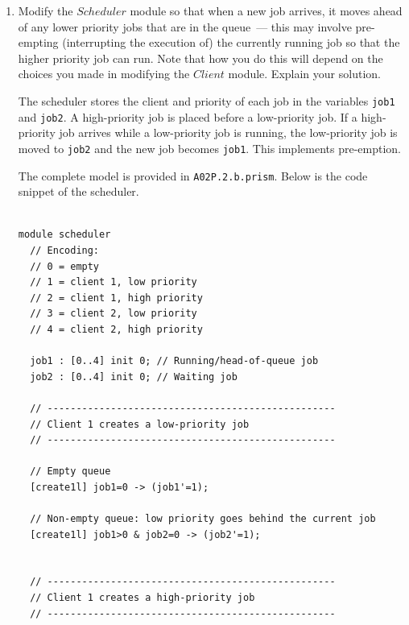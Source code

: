 \documentclass[12pt,a4paper]{article}
\newcommand{\prismident}[1]{\mathit{#1}}
\newcommand{\Pname}[1]{\prismident{#1}}
\begin{document}
\begin{description}
\begin{enumerate}[label=\alph*)]
\begin{lstlisting}
endmodule

module client2 = client1 [state1=state2,
                          task1=task2,
                          create1l=create2l,
                          create1h=create2h,
                          serve1=serve2,
                          finish1=finish2 ]
endmodule

\end{lstlisting}

\color{black}
\fi
%
\item Modify the $\Pname{Scheduler}$ module so that when a new job arrives, it moves ahead of any lower priority jobs that are in the queue~---
this may involve pre-empting (interrupting the execution of) the currently running job so that the higher priority job can run. Note that how
you do this will depend on the choices you made in modifying the $\Pname{Client}$ module. Explain your solution. 
%
\ifwithanswers
\color{blue}
\par
The scheduler stores the client and priority of each job in the variables
\texttt{job1} and \texttt{job2}. A high-priority job is placed before a
low-priority job. If a high-priority job arrives while a low-priority job
is running, the low-priority job is moved to \texttt{job2} and the new
job becomes \texttt{job1}. This implements pre-emption.

The complete model is provided in \texttt{A02P.2.b.prism}. Below is the code snippet of the scheduler. 

\begin{lstlisting}

module scheduler
  // Encoding:
  // 0 = empty
  // 1 = client 1, low priority
  // 2 = client 1, high priority
  // 3 = client 2, low priority
  // 4 = client 2, high priority

  job1 : [0..4] init 0; // Running/head-of-queue job
  job2 : [0..4] init 0; // Waiting job

  // --------------------------------------------------
  // Client 1 creates a low-priority job
  // --------------------------------------------------

  // Empty queue
  [create1l] job1=0 -> (job1'=1);

  // Non-empty queue: low priority goes behind the current job
  [create1l] job1>0 & job2=0 -> (job2'=1);


  // --------------------------------------------------
  // Client 1 creates a high-priority job
  // --------------------------------------------------


\end{lstlisting}
\end{enumerate}
\end{description}
\end{document}
